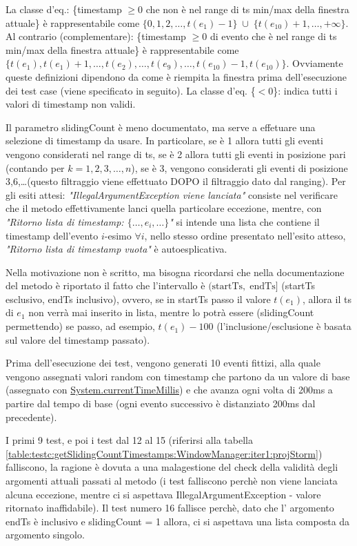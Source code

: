 \documentclass[10pt, a4paper]{article}
\newcommand{\gettablelabel}[5]{table:#1:#2:#3:iter#4:proj#5}
\def\storm{Storm}
\newcommand{\ceq}[1]{\{#1\}}
\begin{document}
	La classe d'eq.: \ceq{timestamp $\ge 0$ che non è nel range di ts min/max della finestra attuale}
	è rappresentabile come $\{0,1,2,\dots,t(e_1)-1\}\;\cup\;\{t(e_{10})+1,\dots,+\infty\}$.
	Al contrario (complementare): 
	\ceq{timestamp $\ge 0$ di evento che è nel range di ts min/max della finestra attuale} è
	rappresentabile come $\{t(e_1),t(e_1)+1,\dots,t(e_2),\dots,t(e_9),\dots,t(e_{10})-1,t(e_{10})\}$. 
	Ovviamente queste definizioni dipendono da come è riempita la finestra prima dell'esecuzione dei test case
	(viene specificato in seguito). La classe d'eq. \ceq{$< 0$}: indica tutti i valori di timestamp non validi.
	
	Il parametro slidingCount è meno documentato, ma serve a effetuare una selezione di timestamp da usare.
	In particolare, se è 1 allora tutti gli eventi vengono considerati nel range di ts, se è 2 allora tutti gli
	eventi in posizione pari (contando per $k=1,2,3,\dots,n$), se è 3, vengono considerati gli eventi di posizione
	3,6,\dots (questo filtraggio viene effettuato DOPO il filtraggio dato dal ranging).
	Per gli esiti attesi: \textit{"IllegalArgumentException viene lanciata"} consiste nel verificare che il metodo
	effettivamente lanci quella particolare eccezione, mentre, con 
	\textit{"Ritorno lista di timestamp: $\{\dots,e_i,\dots\}$"} si intende una lista che contiene il timestamp
	dell'evento $i$-esimo $\forall i$, nello stesso ordine presentato nell'esito atteso, 
	\textit{"Ritorno lista di timestamp vuota"} è autoesplicativa.
	
	Nella motivazione non è scritto, ma bisogna ricordarsi che nella documentazione del metodo è riportato il
	fatto che l'intervallo è $(\text{startTs},\;\text{endTs}]$ 
	(startTs esclusivo, endTs inclusivo), ovvero, se in startTs passo il valore $t(e_1)$, allora
	il ts di $e_1$ non verrà mai inserito in lista, mentre lo potrà essere (slidingCount permettendo)
	se passo, ad esempio, $t(e_1) - 100$ (l'inclusione/esclusione è basata sul valore del timestamp passato).
	
	Prima dell'esecuzione dei test, vengono generati 10 eventi fittizi, alla quale vengono assegnati valori random
	con timestamp che partono da un valore di base (assegnato con 
	\href{https://docs.oracle.com/javase/8/docs/api/java/lang/System.html#currentTimeMillis--}
	{System.currentTimeMillis}) e che avanza ogni volta
	di 200ms a partire dal tempo di base (ogni evento successivo è distanziato 200ms dal precedente).
	
	I primi 9 test, e poi i test dal 12 al 15 (riferirsi alla tabella 
	\ref{\gettablelabel{testc}{getSlidingCountTimestamps}{WindowManager}{1}{\storm}})
	falliscono, la ragione è dovuta a una malagestione del check della validità degli argomenti attuali passati al
	metodo (i test falliscono perchè non viene lanciata alcuna eccezione, mentre ci si aspettava 
	IllegalArgumentException - valore ritornato inaffidabile).  Il test numero 16 fallisce perchè, dato che l'
	argomento endTs è inclusivo e slidingCount = 1 allora, ci si aspettava una lista composta da argomento singolo.
	
\end{document}
